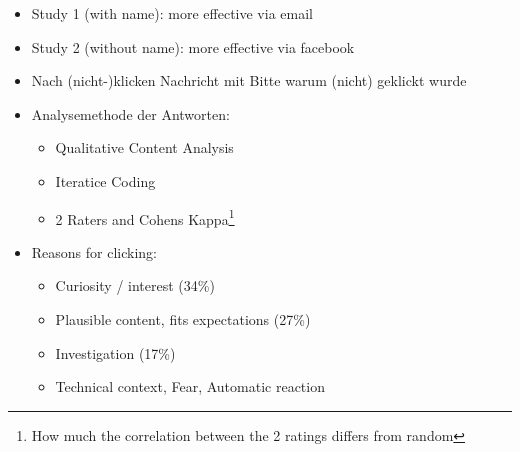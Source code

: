 \documentclass[a4paper,12pt]{scrartcl}
\begin{document}
\begin{itemize}
\begin{itemize}
			\item
				Study 1 (with name): more effective via email
			\item
				Study 2 (without name): more effective via facebook
			\item
				Nach (nicht-)klicken Nachricht mit Bitte warum (nicht) geklickt wurde
			\item
				Analysemethode der Antworten: 
				\begin{itemize}
					\item
						Qualitative Content Analysis
					\item
						Iteratice Coding
					\item
						2 Raters and Cohens Kappa\footnote{How much the correlation between the 2 ratings differs from random}
				\end{itemize}
			\item
				Reasons for clicking:
				\begin{itemize}
					\item
						Curiosity / interest (34\%)
					\item
						Plausible content, fits expectations (27\%)
					\item
						Investigation (17\%)
					\item
						Technical context, Fear, Automatic reaction
				\end{itemize}
				

\end{itemize}
\end{itemize}
\end{document}
